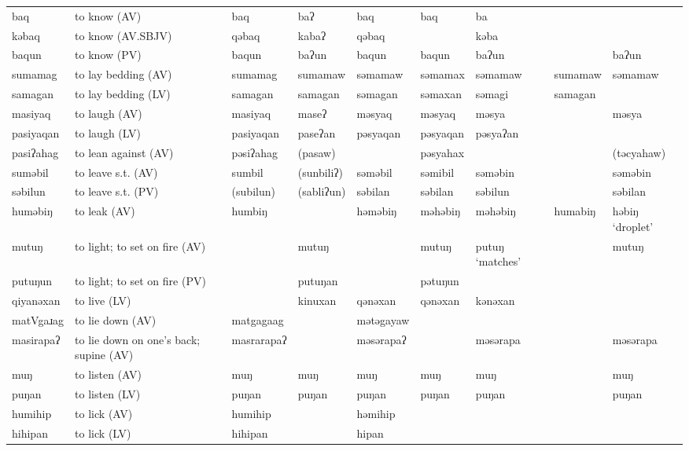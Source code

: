 \begin{landscape}
\begin{longtable}{*{9}{>{\raggedright\arraybackslash}p{}}}
\text{*}baq          & to know (AV) & baq & baʔ & baq & baq & ba &  & \\
\text{*}kəbaq        & to know (AV.SBJV) & qəbaq & kabaʔ & qəbaq &  & kəba &  & \\
\text{*}baqun        & to know (PV) & baqun & baʔun & baqun & baqun & baʔun &  & baʔun\\
\text{*}sumamag      & to lay bedding (AV) & sumamag & sumamaw & səmamaw & səmamax & səmamaw & sumamaw & səmamaw\\
\text{*}samagan      & to lay bedding (LV) & samagan & samagan & səmagan & səmaxan & səmagi & samagan & \\
\text{*}masiyaq      & to laugh (AV) & masiyaq & maseʔ & məsyaq & məsyaq & məsya &  & məsya\\
\text{*}pasiyaqan    & to laugh (LV) & pasiyaqan & paseʔan & pəsyaqan & pəsyaqan & pəsyaʔan &  & \\
\text{*}pasiʔahag    & to lean against (AV) & pəsiʔahag & (pasaw) &  & pəsyahax &  &  & (təcyahaw)\\
\text{*}suməbil      & to leave s.t. (AV) & sumbil & (sunbiliʔ) & səməbil & səmibil & səməbin &  & səməbin\\
\text{*}səbilun      & to leave s.t. (PV) & (subilun) & (sabliʔun) & səbilan & səbilan & səbilun &  & səbilan\\
\text{*}huməbiŋ      & to leak (AV) & humbiŋ &  & həməbiŋ & məhəbiŋ & məhəbiŋ & humabiŋ & həbiŋ `droplet'\\
\text{*}mutuŋ        & to light; to set on fire (AV) &  & mutuŋ &  & mutuŋ & putuŋ `matches' &  & mutuŋ\\
\text{*}putuŋun      & to light; to set on fire (PV) &  & putuŋan &  & pətuŋun &  &  & \\
\text{*}qiyanəxan    & to live (LV) &  & kinuxan & qənəxan & qənəxan & kənəxan &  & \\
\text{*}matVgaɹag    & to lie down (AV) & matgagaag &  & mətəgayaw &  &  &  & \\
\text{*}masirapaʔ    & to lie down on one's back; supine (AV) & masrarapaʔ &  & məsərapaʔ &  & məsərapa &  & məsərapa\\
\text{*}muŋ          & to listen (AV) & muŋ & muŋ & muŋ & muŋ & muŋ &  & muŋ\\
\text{*}puŋan        & to listen (LV) & puŋan & puŋan & puŋan & puŋan & puŋan &  & puŋan\\
\text{*}humihip      & to lick (AV) & humihip &  & həmihip &  &  &  & \\
\text{*}hihipan      & to lick (LV) & hihipan &  & hipan &  &  &  & \\

\end{longtable}
\end{landscape}
